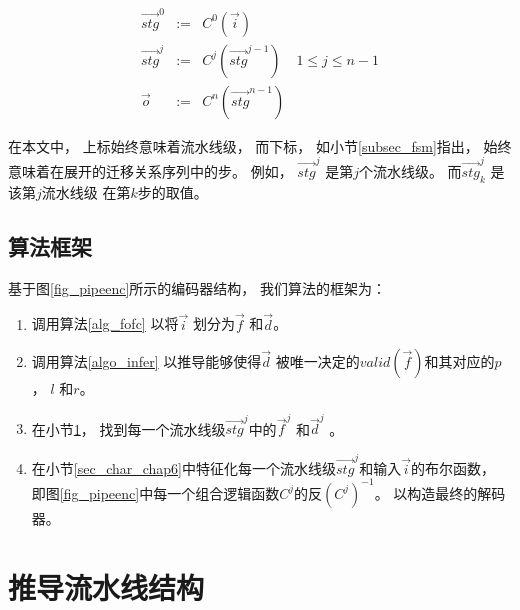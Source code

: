 \begin{equation}\label{equ_genpipe}
\begin{array}{cccc}
\vec{stg}^0   & := & C^0(\vec{i})         &\\
\vec{stg}^j   & := & C^j(\vec{stg}^{j-1}) & 1\le j\le n-1\\
\vec{o}       & := & C^n(\vec{stg}^{n-1}) &
\end{array}
\end{equation}





在本文中，
上标始终意味着流水线级，
而下标，
如小节\ref{subsec_fsm}指出，
始终意味着在展开的迁移关系序列中的步。
例如，
$\vec{stg}^j$ 是第$j$个流水线级。
而$\vec{stg}^j_k$ 是该第$j$流水线级
在第$k$步的取值。

\subsection{算法框架}\label{algo_algoframework}

基于图\ref{fig_pipeenc}所示的编码器结构，
我们算法的框架为：

\begin{enumerate}
 \item 调用算法\ref{alg_fofc} 以将$\vec{i}$ 划分为$\vec{f}$ 和$\vec{d}$。
 \item 调用算法\ref{algo_infer} 以推导能够使得$\vec{d}$
 被唯一决定的$valid(\vec{f})$和其对应的$p$， $l$ 和$r$。
 \item 在小节\ref{sec_pipeinfer}，
 找到每一个流水线级$\vec{stg}^j$中的$\vec{f}^j$ 和$\vec{d}^j$ 。
 \item 在小节\ref{sec_char_chap6}中特征化每一个流水线级$\vec{stg}^j$和输入$\vec{i}$的布尔函数，
 即图\ref{fig_pipeenc}中每一个组合逻辑函数$C^j$的反$(C^j)^{-1}$。
 以构造最终的解码器。
\end{enumerate}



\section{推导流水线结构}\label{sec_pipeinfer}


